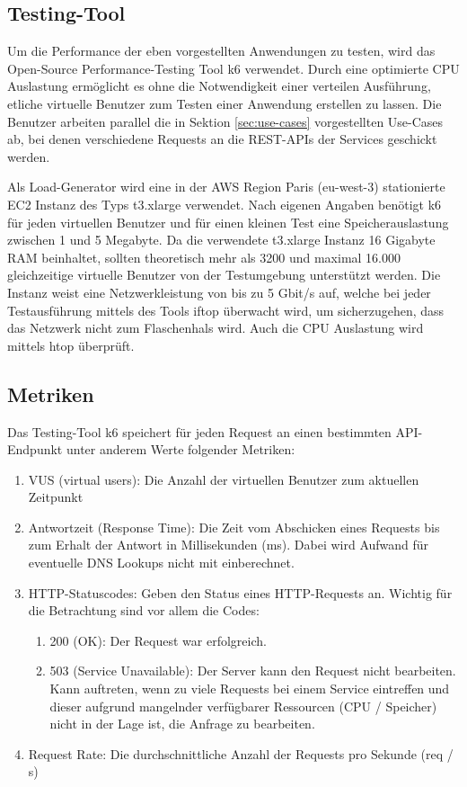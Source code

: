 \subsection{Testing-Tool}
Um die Performance der eben vorgestellten Anwendungen zu testen, wird das Open-Source Performance-Testing Tool k6 \cite{noauthor_load_nodate} verwendet. Durch eine optimierte CPU Auslastung ermöglicht es ohne die Notwendigkeit einer verteilen Ausführung, etliche virtuelle Benutzer zum Testen einer Anwendung erstellen zu lassen\cite{noauthor_running_nodate}. Die Benutzer arbeiten parallel die in Sektion \ref{sec:use-cases} vorgestellten Use-Cases ab, bei denen verschiedene Requests an die REST-APIs der Services geschickt werden. 

Als Load-Generator wird eine in der AWS Region Paris (eu-west-3) stationierte EC2 Instanz des Typs t3.xlarge verwendet.
Nach eigenen Angaben benötigt k6 für jeden virtuellen Benutzer und für einen kleinen Test eine Speicherauslastung zwischen 1 und 5 Megabyte\cite{noauthor_running_nodate}. Da die verwendete t3.xlarge Instanz 16 Gigabyte RAM beinhaltet, sollten theoretisch mehr als 3200 und maximal 16.000 gleichzeitige virtuelle Benutzer von der Testumgebung unterstützt werden. Die Instanz weist eine Netzwerkleistung von bis zu 5 Gbit/s auf, welche bei jeder Testausführung mittels des Tools iftop überwacht wird, um sicherzugehen, dass das Netzwerk nicht zum Flaschenhals wird. Auch die CPU Auslastung wird mittels htop überprüft.

\subsection{Metriken}
Das Testing-Tool k6 speichert für jeden Request an einen bestimmten API-Endpunkt unter anderem Werte folgender Metriken:
\begin{enumerate}
    \item VUS (virtual users): Die Anzahl der virtuellen Benutzer zum aktuellen Zeitpunkt 
    
    \item Antwortzeit (Response Time): Die Zeit vom Abschicken eines Requests bis zum Erhalt der Antwort in Millisekunden (ms). Dabei wird Aufwand für eventuelle DNS Lookups nicht mit einberechnet. 
    
    \item HTTP-Statuscodes: Geben den Status eines HTTP-Requests an. Wichtig für die Betrachtung sind vor allem die Codes:
        \begin{enumerate}
            \item 200 (OK): Der Request war erfolgreich.
            \item 503 (Service Unavailable): Der Server kann den Request nicht bearbeiten. Kann auftreten, wenn zu viele Requests bei einem Service eintreffen und dieser aufgrund mangelnder verfügbarer Ressourcen (CPU / Speicher) nicht in der Lage ist, die Anfrage zu bearbeiten.
        \end{enumerate}
        
    \item Request Rate: Die durchschnittliche Anzahl der Requests pro Sekunde (req / s)
\end{enumerate}

